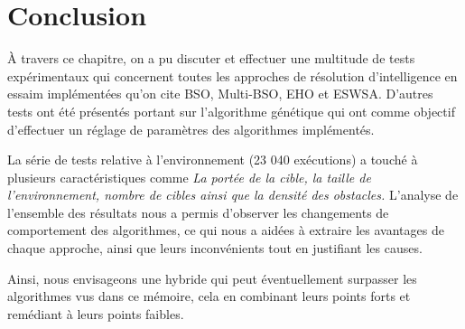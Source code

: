 	
	
	
	
	
	\section{Conclusion}
	
 À travers ce chapitre, on a pu discuter et effectuer une multitude de tests expérimentaux qui concernent toutes les approches de résolution d'intelligence en essaim implémentées qu'on cite 
 BSO, Multi-BSO, EHO et ESWSA.
 D'autres tests ont été présentés portant sur l'algorithme génétique qui ont comme objectif d'effectuer un réglage de paramètres des algorithmes implémentés.
 
 La série de tests relative à l'environnement (23 040 exécutions) a touché à plusieurs caractéristiques comme \textit{La portée de la cible, la taille de l'environnement, nombre de cibles ainsi que la densité des obstacles.} 
 L'analyse de l'ensemble des résultats nous a permis d'observer les changements de comportement des algorithmes, ce qui nous a aidées à extraire les avantages de chaque approche, ainsi que leurs inconvénients tout en justifiant les causes.
 
 Ainsi, nous envisageons une hybride qui peut éventuellement surpasser les algorithmes vus dans ce mémoire, cela en combinant leurs points forts et remédiant à leurs points faibles.
 

